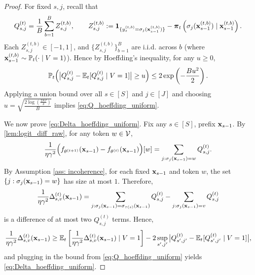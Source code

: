 \documentclass{article}
\theoremstyle{plain}
\theoremstyle{definition}
\theoremstyle{remark}
\begin{document}
\begin{proof}
    For fixed $s, j$, recall that
    \[
    Q^{(t)}_{s,j}
    = \frac{1}{B}\sum_{b=1}^B Z^{(t,b)}_{s,j},
    \qquad
    Z^{(t,b)}_{s,j}
    := \boldsymbol{1}_{\{ y_{s}^{(t, b)} = \sigma_j(\mathbf{x}_{s-1}^{(t, b)}) \}}
        - \boldsymbol{\pi}_t\left(\sigma_j(\mathbf{x}_{s-1}^{(t, b)}) \mid \mathbf{x}_{s-1}^{(t, b)}\right).
    \]
    Each $Z^{(t,b)}_{s,j}\in[-1,1]$, and 
    $\{Z^{(t,b)}_{s,j}\}_{b=1}^B$ are i.i.d. across $b$ (where $\mathbf{x}^{(t,b)}_{s-1}\sim \mathbb{P}_t(\cdot\mid V=1)$). Hence by Hoeffding's inequality, for any $u\geq 0$,
    \[
    \mathbb{P}_t\Big(\big|Q^{(t)}_{s,j} - \mathbb{E}_t[Q^{(t)}_{s,j}\mid V=1]\big|\geq u\Big)
    \leq2\exp\left(-\frac{B u^2}{2}\right).
    \]
    Applying a union bound over all $s\in[S]$ and $j\in[J]$ and choosing $u=\sqrt{\frac{2\log\left(\frac{2SJ}{\delta}\right)}{B}}$ implies \eqref{eq:Q_hoeffding_uniform}.
    
    We now prove \eqref{eq:Delta_hoeffding_uniform}. Fix any $s\in[S]$, prefix $\mathbf{x}_{s-1}$.
    By \cref{lem:logit_diff_raw}, for any token $w\in\mathcal{V}$,
    \[
    \frac{1}{\eta \gamma^2}\Bigl(f_{\theta^{(t+1)}}(\mathbf{x}_{s-1})-f_{\theta^{(t)}}(\mathbf{x}_{s-1})\Bigr)[w]
    = \sum_{j:\sigma_j(\mathbf{x}_{s-1})=w} Q^{(t)}_{s,j}.
    \]
    By Assumption \ref{ass: incoherence}, for each fixed $\mathbf{x}_{s-1}$ and token $w$, the set $\{j:\sigma_j(\mathbf{x}_{s-1})=w\}$ has size at most $1$. Therefore,
    \[
    \frac{1}{\eta \gamma^2}\Delta^{(t)}_{s,v}(\mathbf{x}_{s-1})
    = \sum_{j:\sigma_j(\mathbf{x}_{s-1})=\sigma_{\tau(s)}(\mathbf{x}_{s-1})} Q^{(t)}_{s,j}
    -
    \sum_{j:\sigma_j(\mathbf{x}_{s-1})=v} Q^{(t)}_{s,j}
    \]
    is a difference of at most two $Q^{(t)}_{s,j}$ terms. Hence, 
    \begin{align*}
    \frac{1}{\eta \gamma^2}\Delta^{(t)}_{s,v}(\mathbf{x}_{s-1})
    \geq
    \mathbb{E}_t\left[\frac{1}{\eta \gamma^2}\Delta^{(t)}_{s,v}(\mathbf{x}_{s-1})\mid V=1\right]
    - 2\sup_{s',j'}\big|Q^{(t)}_{s',j'} - \mathbb{E}_t[Q^{(t)}_{s',j'}\mid V=1]\big|,
    \end{align*}
    and plugging in the bound from \eqref{eq:Q_hoeffding_uniform} yields \eqref{eq:Delta_hoeffding_uniform}.
\end{proof}
\end{document}
